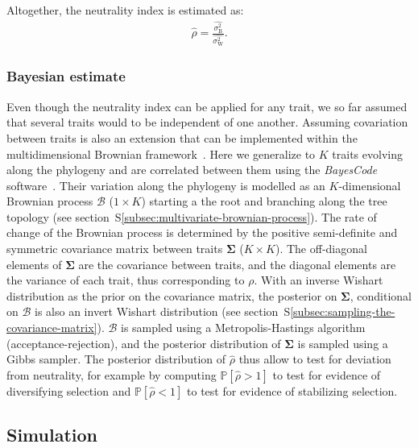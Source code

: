 \documentclass{article}
\newcommand{\UniDimArray}[1]{\bm{#1}}
\newcommand{\BiDimArray}[1]{\bm{#1}}
\newcommand{\proba}{\mathbb{P}}
\newcommand{\RateBetween}{\sigma^2_{\mathrm{B}}}
\newcommand{\RateWhithin}{\sigma^2_{\mathrm{W}}}
\newcommand{\EstRateBetween}{\widehat{\RateBetween}}
\newcommand{\EstRateWhithin}{\widehat{\RateWhithin}}
\newcommand{\NI}{\rho}
\newcommand{\EstNI}{\widehat{\rho}}
\newcommand{\Ntrait}{K}
\newcommand{\Covariancematrix}{\Sigma}
\newcommand{\CovarianceMatrix}{\BiDimArray{\Covariancematrix}}
\newcommand{\brownian}{\mathcal{B}}
\newcommand{\Brownian}{\UniDimArray{\brownian}}
\begin{document}
Altogether, the neutrality index is estimated as:
\begin{gather}
    \EstNI = \frac{\EstRateBetween}{\EstRateWhithin}. \label{eq:estimated-NI}
\end{gather}

\subsubsection*{Bayesian estimate}

Even though the neutrality index can be applied for any trait, we so far assumed that several traits would to be independent of one another.
Assuming covariation between traits is also an extension that can be implemented within the multidimensional Brownian framework~\cite{huelsenbeck_detecting_2003, lartillot_phylogenetic_2011, lartillot_joint_2012, latrille_inferring_2021}.
Here we generalize to $\Ntrait$ traits evolving along the phylogeny and are correlated between them using the \textit{BayesCode} software~\cite{latrille_inferring_2021}.
Their variation along the phylogeny is modelled as an $\Ntrait$-dimensional Brownian process $\Brownian$ ($1 \times \Ntrait$) starting a the root and branching along the tree topology (see section~S\ref{subsec:multivariate-brownian-process}).
The rate of change of the Brownian process is determined by the positive semi-definite and symmetric covariance matrix between traits $\CovarianceMatrix$ ($\Ntrait \times \Ntrait$).
The off-diagonal elements of $\CovarianceMatrix$ are the covariance between traits, and the diagonal elements are the variance of each trait, thus corresponding to $\NI$.
With an inverse Wishart distribution as the {prior} on the covariance matrix, the {posterior} on $\CovarianceMatrix$, conditional on $\brownian$ is also an invert Wishart distribution (see section~S\ref{subsec:sampling-the-covariance-matrix}).
$\Brownian$ is sampled using a Metropolis-Hastings algorithm (acceptance-rejection), and the posterior distribution of $\CovarianceMatrix$ is sampled using a Gibbs sampler.
The posterior distribution of $\EstNI$ thus allow to test for deviation from neutrality, for example by computing $\proba [\EstNI > 1 ]$ to test for evidence of diversifying selection and $\proba [\EstNI < 1 ]$ to test for evidence of stabilizing selection.

\subsection*{Simulation}\label{subsec:simulations}
\end{document}
